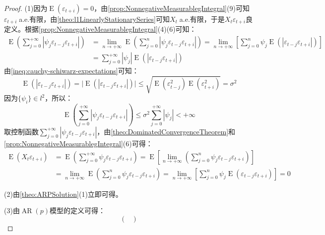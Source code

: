 \begin{proof}
	(1)因为$\operatorname{E}(\varepsilon_{t+i})=0$，由\cref{prop:NonnegativeMeasurablegIntegral}(9)可知$\varepsilon_{t+i}\;$a.e.有限，由\cref{theo:l1LinearlyStationarySeries}可知$X_t\;$a.e.有限，于是$X_t\varepsilon_{t+i}$良定义。根据\cref{prop:NonnegativeMeasurablegIntegral}(4)(6)可知：
	\begin{align*}
		\operatorname{E}\left(\sum_{j=0}^{+\infty}|\psi_j\varepsilon_{t-j}\varepsilon_{t+i}|\right)
		&=\lim_{n\to+\infty}\operatorname{E}\left(\sum_{j=0}^{n}|\psi_j\varepsilon_{t-j}\varepsilon_{t+i}|\right)
		=\lim_{n\to+\infty}\left[\sum_{j=0}^{n}\psi_j\operatorname{E}(|\varepsilon_{t-j}\varepsilon_{t+i}|)\right] \\
		&=\sum_{j=0}^{+\infty}|\psi_j|\operatorname{E}(|\varepsilon_{t-j}\varepsilon_{t+i}|)
	\end{align*}
	由\cref{ineq:cauchy-schiwarz-expectations}可知：
	\begin{equation*}
		\operatorname{E}(|\varepsilon_{t-j}\varepsilon_{t+i}|)=\Big|\operatorname{E}(|\varepsilon_{t-j}\varepsilon_{t+i}|)\Big|\leqslant\sqrt{\operatorname{E}(\varepsilon_{t-j}^2)\operatorname{E}(\varepsilon_{t+i}^2)}=\sigma^2
	\end{equation*}
	因为$\{\psi_i\}\in l^2$，所以：
	\begin{equation*}
		\operatorname{E}\left(\sum_{j=0}^{+\infty}|\psi_j\varepsilon_{t-j}\varepsilon_{t+i}|\right)\leqslant\sigma^2\sum_{j=0}^{+\infty}|\psi_j|<+\infty
	\end{equation*}
	取控制函数$\sum\limits_{j=0}^{+\infty}|\psi_j\varepsilon_{t-j}\varepsilon_{t+i}|$，由\cref{theo:DominatedConvergenceTheorem}和\cref{prop:NonnegativeMeasurablegIntegral}(6)可得：
	\begin{align*}
		\operatorname{E}(X_t\varepsilon_{t+i})&=\operatorname{E}\left(\sum_{j=0}^{+\infty}\psi_j\varepsilon_{t-j}\varepsilon_{t+i}\right)=\operatorname{E}\left[\lim_{n\to+\infty}\left(\sum_{j=0}^{n}\psi_j\varepsilon_{t-j}\varepsilon_{t+i}\right)\right] \\
		&=\lim_{n\to+\infty}\operatorname{E}\left(\sum_{j=0}^{n}\psi_j\varepsilon_{t-j}\varepsilon_{t+i}\right)=\lim_{n\to+\infty}\left[\sum_{j=0}^{n}\psi_j\operatorname{E}(\varepsilon_{t-j}\varepsilon_{t+i})\right]=0
	\end{align*}\par
	(2)由\cref{theo:ARPSolution}(1)立即可得。\par
	(3)由$\operatorname{AR}(p)$模型的定义可得：
	\begin{equation*}
		\begin{pmatrix}

\end{pmatrix}
\end{equation*}
\end{proof}
